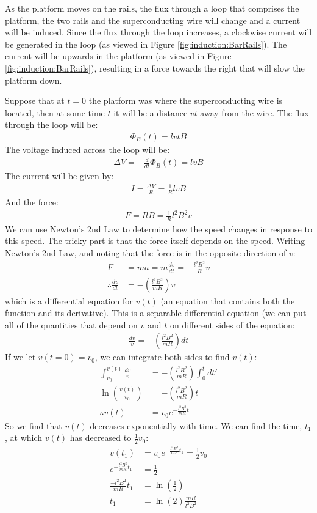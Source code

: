 \begin{solution}
As the platform moves on the rails, the flux through a loop that comprises the platform, the two rails and the superconducting wire will change and a current will be induced. Since the flux through the loop increases, a clockwise current will be generated in the loop (as viewed in Figure \ref{fig:induction:BarRails}). The current will be upwards in the platform (as viewed in Figure \ref{fig:induction:BarRails}), resulting in a force towards the right that will slow the platform down. 

Suppose that at $t=0$ the platform was where the superconducting wire is located, then at some time $t$ it will be a distance $vt$ away from the wire. The flux through the loop will be:
\begin{align*}
\Phi_B(t)=lvtB
\end{align*}
The voltage induced across the loop will be:
\begin{align*}
\Delta V=-\frac{d}{dt}\Phi_B(t)=lvB
\end{align*}
The current will be given by:
\begin{align*}
I=\frac{\Delta V}{R}=\frac{1}{R}lvB
\end{align*}
And the force:
\begin{align*}
F=IlB=\frac{1}{R}l^2B^2v
\end{align*}
We can use Newton's 2nd Law to determine how the speed changes in response to this speed. The tricky part is that the force itself depends on the speed. Writing Newton's 2nd Law, and noting that the force is in the opposite direction of $v$:
\begin{align*}
F&=ma=m\frac{dv}{dt}=-\frac{l^2B^2}{R}v\\
\therefore \frac{dv}{dt}&=-\left(\frac{l^2B^2}{mR}\right)v
\end{align*}
which is a differential equation for $v(t)$ (an equation that contains both the function and its derivative). This is a separable differential equation (we can put all of the quantities that depend on $v$ and $t$ on different sides of the equation:
\begin{align*}
\frac{dv}{v}=-\left(\frac{l^2B^2}{mR}\right)dt
\end{align*}
If we let $v(t=0)=v_0$, we can integrate both sides to find $v(t)$:
\begin{align*}
\int_{v_0}^{v(t)}\frac{dv}{v}&=-\left(\frac{l^2B^2}{mR}\right)\int_0^tdt'\\
\ln\left( \frac{v(t)}{v_0} \right)&=-\left(\frac{l^2B^2}{mR}\right)t\\
\therefore v(t)&=v_0e^{-\frac{l^2B^2}{mR}t}
\end{align*}
So we find that $v(t)$ decreases exponentially with time. We can find the time, $t_1$, at which $v(t)$ has decreased to $\frac{1}{2}v_0$:
\begin{align*}
v(t_1)&=v_0e^{-\frac{l^2B^2}{mR}t_1}=\frac{1}{2}v_0\\
e^{-\frac{l^2B^2}{mR}t_1}&=\frac{1}{2}\\
\frac{-l^2B^2}{mR}t_1&=\ln\left(\frac{1}{2}  \right)\\
t_1&=\ln(2)\frac{mR}{l^2B^2}
\end{align*}
\end{solution}

